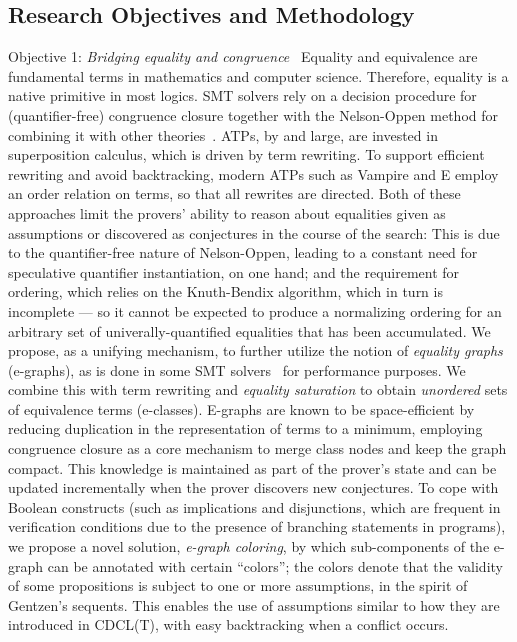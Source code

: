 \subsection{Research Objectives and Methodology}


\begin{paragraph}{Objective 1: {\it Bridging equality and congruence}}~
Equality and equivalence are fundamental terms in mathematics and computer science.
Therefore, equality is a native primitive in most logics.
SMT solvers rely on a decision procedure for (quantifier-free) congruence closure together with the Nelson-Oppen method for combining it with other theories~\cite{JACM1980:Nelson}.
ATPs, by and large, are invested in superposition calculus, which is driven by term rewriting.
To support efficient rewriting and avoid backtracking, modern ATPs such as Vampire and E employ an order relation on terms, so that all rewrites are directed.
Both of these approaches limit the provers' ability to reason about equalities given as assumptions or discovered as conjectures in the course of the search:
This is due to the quantifier-free nature of Nelson-Oppen, leading to a constant need for speculative quantifier instantiation, on one hand;
and the requirement for ordering, which relies on the Knuth-Bendix algorithm, which in turn is incomplete --- so it cannot be expected to produce a normalizing ordering for an arbitrary set of univerally-quantified equalities that has been accumulated.
We propose, as a unifying mechanism, to further utilize the notion of \emph{equality graphs} (e-graphs), as is done in some SMT solvers~\cite{IC2007:Nieuwenhuis,CADE2007:deMoura,TACAS2017:Barbosa} for performance purposes.
We combine this with term rewriting and \emph{equality saturation} to obtain \emph{unordered} sets of equivalence terms (e-classes).
E-graphs are known to be space-efficient by reducing duplication in the representation of terms to a minimum, employing congruence closure as a core mechanism to merge class nodes and keep the graph compact.
This knowledge is maintained as part of the prover's state and can be updated incrementally when the prover discovers new conjectures.
To cope with Boolean constructs (such as implications and disjunctions, which are frequent in verification conditions due to the presence of branching statements in programs), we propose a novel solution, \emph{e-graph coloring}, by which sub-components of the e-graph can be annotated with certain ``colors''; the colors denote that the validity of some propositions is subject to one or more assumptions, in the spirit of Gentzen's sequents.
This enables the use of assumptions similar to how they are introduced in CDCL(T), with easy backtracking when a conflict occurs.


\end{paragraph}
